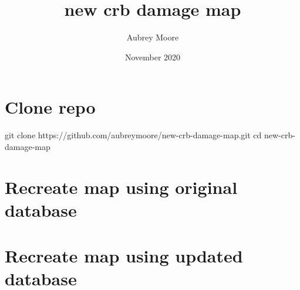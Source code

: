 \documentclass{scrartcl}
\title{new crb damage map}
\author{Aubrey Moore}
\date{November 2020}
\begin{document}
\maketitle

\section{Clone repo}

\begin{listing}
  git clone https://github.com/aubreymoore/new-crb-damage-map.git
  cd new-crb-damage-map
\end{listing}



\section{Recreate map using original database}

\section{Recreate map using updated database}
\end{document}
